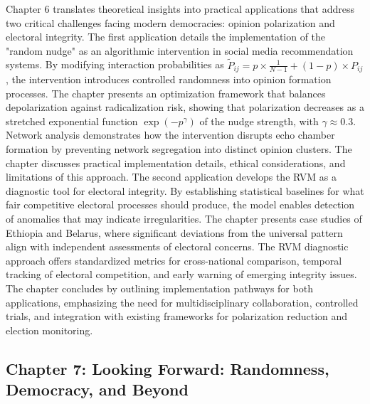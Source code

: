 Chapter 6 translates theoretical insights into practical applications that address two critical challenges facing modern democracies: opinion polarization and electoral integrity. The first application details the implementation of the "random nudge" as an algorithmic intervention in social media recommendation systems. By modifying interaction probabilities as $\widetilde{P}_{ij} = p \times \frac{1}{N - 1} + (1 - p) \times P_{ij}$, the intervention introduces controlled randomness into opinion formation processes. The chapter presents an optimization framework that balances depolarization against radicalization risk, showing that polarization decreases as a stretched exponential function $\exp(-p^\gamma)$ of the nudge strength, with $\gamma \approx 0.3$. Network analysis demonstrates how the intervention disrupts echo chamber formation by preventing network segregation into distinct opinion clusters. The chapter discusses practical implementation details, ethical considerations, and limitations of this approach. The second application develops the RVM as a diagnostic tool for electoral integrity. By establishing statistical baselines for what fair competitive electoral processes should produce, the model enables detection of anomalies that may indicate irregularities. The chapter presents case studies of Ethiopia and Belarus, where significant deviations from the universal pattern align with independent assessments of electoral concerns. The RVM diagnostic approach offers standardized metrics for cross-national comparison, temporal tracking of electoral competition, and early warning of emerging integrity issues. The chapter concludes by outlining implementation pathways for both applications, emphasizing the need for multidisciplinary collaboration, controlled trials, and integration with existing frameworks for polarization reduction and election monitoring.

\subsection*{Chapter 7: Looking Forward: Randomness, Democracy, and Beyond}

